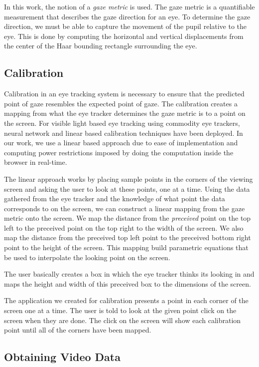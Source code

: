 \documentclass[annual]{acmsiggraph}
\begin{document}
In this work, the notion of a \emph{gaze metric} is used. The gaze metric is a
quantifiable measurement that describes the gaze direction for an eye. To
determine the gaze direction, we must be able to capture the movement of the
pupil relative to the eye. This is done by computing the horizontal and
vertical displacements from the center of the Haar bounding rectangle
surrounding the eye.

\subsection{Calibration}

Calibration in an eye tracking system is necessary to ensure that the predicted
point of gaze resembles the expected point of gaze. The calibration creates a
mapping from what the eye tracker determines the gaze metric is to a point on
the screen. For visible light based eye tracking using commodity eye trackers,
neural network \cite{holland2012eye} and linear based calibration techniques
have been deployed. In our work, we use a linear based approach due to ease of
implementation and computing power restrictions imposed by doing the
computation inside the browser in real-time.

The linear approach works by placing sample points in the corners of the
viewing screen and asking the user to look at these points, one at a time.
Using the data gathered from the eye tracker and the knowledge of what point
the data corresponds to on the screen, we can construct a linear mapping from
the gaze metric onto the screen. We map the distance from the \emph{preceived}
point on the top left to the preceived point on the top right to the width of
the screen. We also map the distance from the preceived top left point to the
preceived bottom right point to the height of the screen. This mapping build
parametric equations that be used to interpolate the looking point on the
screen.

The user basically creates a box in which the eye tracker thinks its looking in
and maps the height and width of this preceived box to the dimensions of the
screen.

The application we created for calibration presents a point in each corner of
the screen one at a time. The user is told to look at the given point click on
the screen when they are done. The click on the screen will show each
calibration point until all of the corners have been mapped.

\subsection{Obtaining Video Data}
\end{document}
